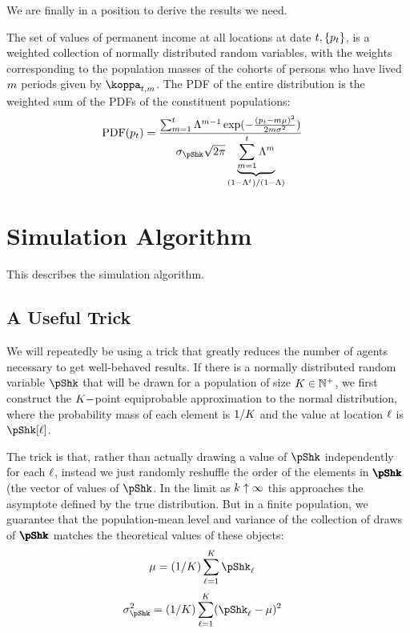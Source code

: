 \documentclass[../BufferStockTheory.tex]{subfiles}\usepackage{ApndxSteadyState}
\begin{document}
  We are finally in a position to derive the results we need.

  The set of values of permanent income at all locations at date $t,\{p_{t}\}$, is a weighted collection of normally distributed random variables, with the weights corresponding to the population masses of the cohorts of persons who have lived $m$ periods given by $\wgt_{\FutPer,\LooPer}$.  The PDF of the entire distribution is the weighted sum of the PDFs of the constituent populations:
  \begin{align}
    \PDF(\pLog_{\FutPer}) & = \frac{\sum _{\LooPer=1}^{\FutPer}
                            \Liv^{\LooPer-1}
                            \exp({-\frac{(\pLog_{\FutPer}-\LooPer \pShkMean )^2}{2
                            \LooPer \sigma ^2}})}{
                            \sigma_{\pShk} \sqrt{2 \pi }
                            \underbrace{
                            \sum_{\LooPer=1}^{\FutPer}\Liv^{\LooPer}
                            }_{\left(1-\Liv^{\FutPer}\right)/(1-\Liv)}
                            }
  \end{align}

  \section{Simulation Algorithm}

  This describes the simulation algorithm.

  \subsection{A Useful Trick}

  We will repeatedly be using a trick that greatly reduces the number of agents necessary to get well-behaved results.  If there is a normally distributed random variable $\pShk$ that will be drawn for a population of size $K \in \mathbb{N}^{+}$, we first construct the $K-$point equiprobable approximation to the normal distribution, where the probability mass of each element is $1/K$ and the value at location $\ell$ is $\pShk[\posn]$.

  The trick is that, rather than actually drawing a value of $\pShk$ independently for each $\ell$, instead we just randomly reshuffle the order of the elements in $\vctr{\pShk}$ (the vector of values of $\pShk$.  In the limit as $k \uparrow \infty$ this approaches the asymptote defined by the true distribution.  But in a finite population, we guarantee that the population-mean level and variance of the collection of draws of $\vctr{\pShk}$ matches the theoretical values of these objects:
  \begin{align}
    \mu & = (1/\Mass)\sum_{\posn=1}^{\Mass}\pShk_{\posn}
  \end{align}
  \begin{align}
    \sigma^{2}_{\pShk} & = (1/\Mass)\sum_{\posn=1}^{\Mass}(\pShk_{\posn} - \mu)^{2}
  \end{align}
\end{document}
